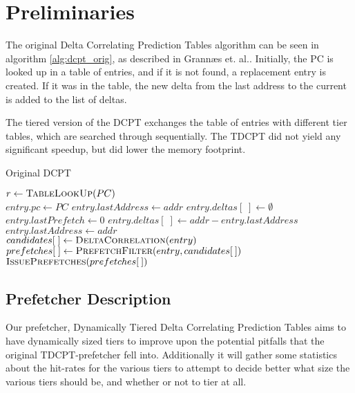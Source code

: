 \section{Preliminaries}


The original Delta Correlating Prediction Tables algorithm can be seen in
algorithm \ref{alg:dcpt_orig}, as described in Grannæs et.
al.\cite{Grannaes481837}. Initially, the PC is looked up in a table of entries,
and if it is not found, a replacement entry is created. If it was in the table,
the new delta from the last address to the current is added to the list of
deltas. 


The tiered version of the DCPT exchanges the table of entries with different
tier tables, which are searched through sequentially. The TDCPT did not yield
any significant speedup, but did lower the memory footprint.


\begin{algorithm}
\footnotesize
\caption{Original DCPT \cite{Grannaes481837}}
  \begin{algorithmic}[1]
      \State $r \gets \Call{TableLookUp}{PC}$ \\

        \State $entry.pc \gets PC$
        \State $entry.lastAddress \gets addr$
        \State $entry.deltas[\;] \gets \emptyset$
        \State $entry.lastPrefetch \gets 0$
        \State $entry.deltas[\;] \gets addr - entry.lastAddress$
        \State $entry.lastAddress \gets addr$ \\

        \State $candidates[\;] \gets \Call{DeltaCorrelation}{entry}$
        \State $prefetches[\;] \gets \Call{PrefetchFilter}{entry, candidates[\:]}$
        \State $\Call{IssuePrefetches}{prefetches[\:]}$
      \EndIf
    \EndProcedure
  \end{algorithmic}
  \label{alg:dcpt_orig}
\end{algorithm}


\subsection{Prefetcher Description}

Our prefetcher, Dynamically Tiered Delta Correlating Prediction
Tables aims to have dynamically sized tiers to improve upon the potential
pitfalls that the original TDCPT-prefetcher fell into. Additionally it will
gather some statistics about the hit-rates for the various tiers to attempt to
decide better what size the various tiers should be, and whether or not to tier
at all.

